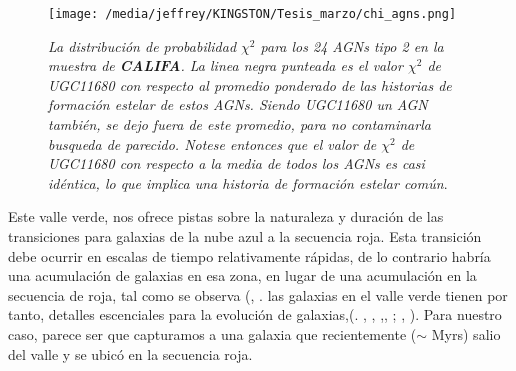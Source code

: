 \documentclass[12pt]{article}
\begin{document}
\begin{figure}[ht]
  \centering
  \texttt{[image: /media/jeffrey/KINGSTON/Tesis\_marzo/chi\_agns.png]}
  \caption[spectra]
   {\small \textsl{La distribución de probabilidad $\chi^2$ para los 24 AGNs tipo 2 en la muestra de  \textbf{CALIFA}. La linea negra punteada es el valor $\chi^2$ de UGC11680 con respecto al promedio ponderado de las  historias de formación estelar de estos AGNs. Siendo UGC11680 un AGN también, se dejo fuera de este promedio, para no contaminarla busqueda de parecido. Notese entonces que el valor de  $\chi^2$ de UGC11680 con respecto a la media de todos los AGNs es casi idéntica, lo que implica una historia de formación estelar común}.}
\label{chiagns}
\end{figure}




 Este valle verde, nos ofrece pistas sobre la naturaleza y duración de las transiciones para  galaxias de la nube azul a la secuencia roja. Esta transición
debe ocurrir en escalas de tiempo relativamente rápidas, de lo contrario habría una acumulación de galaxias en esa zona, en lugar de una
acumulación en la secuencia de roja, tal como se observa (\cite{arnouts2007}, \cite{martin2007}. las galaxias en el valle verde tienen por tanto, detalles escenciales para la evolución de galaxias,(\cite{bell2004}. \cite{faber2007}, \cite{martin2007}, \cite{schiminovich2007},\cite{wyder2007}, \cite{mendez2011}; \cite{goncalves2012}, \cite{schawinski2014}). Para nuestro caso, parece ser que capturamos a una galaxia que recientemente ($\sim$ Myrs) salio del valle y se ubicó en la secuencia roja.
\end{document}
